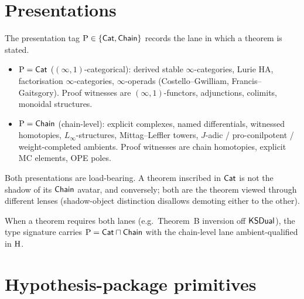 \section{Presentations}
\label{sec:type-presentations}

\begin{definition}
\label{def:type-presentation}
The presentation tag $\mathrm{P}\in\{\mathsf{Cat},\mathsf{Chain}\}$ records the lane in
which a theorem is stated.
\begin{itemize}
\item $\mathrm{P}=\mathsf{Cat}$ ($(\infty,1)$-categorical): derived stable
$\infty$-categories, Lurie HA, factorisation $\infty$-categories,
$\infty$-operads (Costello--Gwilliam, Francis--Gaitsgory). Proof
witnesses are $(\infty,1)$-functors, adjunctions, colimits,
monoidal structures.
\item $\mathrm{P}=\mathsf{Chain}$ (chain-level): explicit complexes, named
differentials, witnessed homotopies, $L_\infty$-structures,
Mittag--Leffler towers, $J$-adic / pro-conilpotent / weight-completed
ambients. Proof witnesses are chain homotopies, explicit MC
elements, OPE poles.
\end{itemize}
Both presentations are load-bearing. A theorem inscribed in $\mathsf{Cat}$
is not the shadow of its $\mathsf{Chain}$ avatar, and conversely; both are the
theorem viewed through different lenses (shadow-object distinction
disallows demoting either to the other).
\end{definition}

When a theorem requires both lanes (e.g.\ Theorem~B inversion off
$\mathsf{KSDual}$), the type signature carries
$\mathrm{P}=\mathsf{Cat}\sqcap\mathsf{Chain}$ with the chain-level lane
ambient-qualified in $\mathrm{H}$.

\section{Hypothesis-package primitives}
\label{sec:type-hypothesis}

